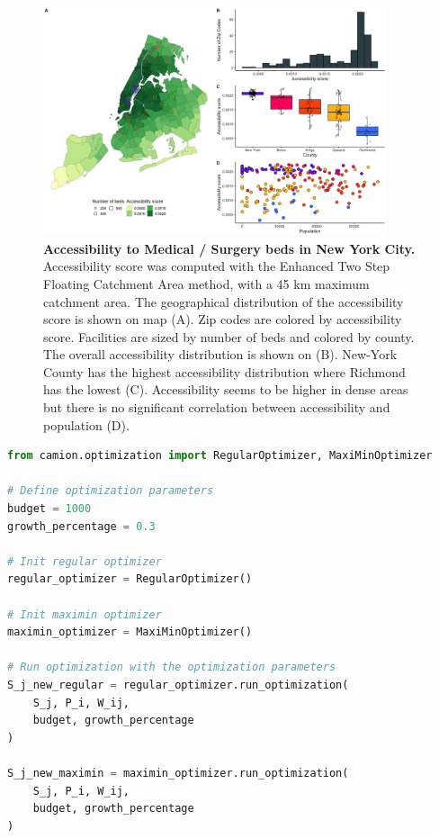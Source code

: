 \begin{figure}[H]
    \includegraphics[width=0.9\textwidth]{images/camion-ny/fig2.png}
    \centering
    \caption{
        \textbf{Accessibility to Medical / Surgery beds in New York City.} Accessibility score was computed with the Enhanced Two Step Floating Catchment Area method, with a 45 km maximum catchment area. The geographical distribution of the accessibility score is shown on map (A). Zip codes are colored by accessibility score. Facilities are sized by number of beds and colored by county. The overall accessibility distribution is shown on (B). New-York County has the highest accessibility distribution where Richmond has the lowest (C). Accessibility seems to be higher in dense areas but there is no significant correlation between accessibility and population (D).
    }
    \label{fig:camion-ny-accessibility}
\end{figure}

\begin{minipage}{\textwidth}
\begin{lstlisting}[language=Python, caption=Optimize accessibility with \ac{camion}]
from camion.optimization import RegularOptimizer, MaxiMinOptimizer

# Define optimization parameters
budget = 1000
growth_percentage = 0.3

# Init regular optimizer
regular_optimizer = RegularOptimizer()

# Init maximin optimizer
maximin_optimizer = MaxiMinOptimizer()

# Run optimization with the optimization parameters
S_j_new_regular = regular_optimizer.run_optimization(
    S_j, P_i, W_ij,
    budget, growth_percentage
)

S_j_new_maximin = maximin_optimizer.run_optimization(
    S_j, P_i, W_ij,
    budget, growth_percentage
)
\end{lstlisting}
\end{minipage}

